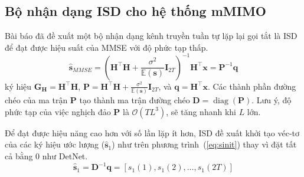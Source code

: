 \subsection{Bộ nhận dạng ISD cho hệ thống mMIMO}

Bài báo đã đề xuất một bộ nhận dạng kênh truyền tuần tự lặp lại gọi tắt là ISD để đạt được hiệu suất của MMSE với độ phức tạp thấp.
\begin{equation}
    \hat{\mathbf{s}}_{MMSE}=\left(\mathbf{H}^\top \mathbf{H}+\frac{\sigma^2}{\mathbb{E}(\mathbf{s})} \mathbf{I}_{2T}\right)^{-1} \mathbf{H}^\top \mathbf{x}=\mathbf{P}^{-1} \mathbf{q}
\end{equation}
ký hiệu $\mathbf{G}_\mathbf{H} = \mathbf{H}^\top \mathbf{H}$, $\mathbf{P} = \mathbf{H}^\top \mathbf{H}+\frac{\sigma^2}{\mathbb{E}(\mathbf{s})} \mathbf{I}_{2T}$, và $\mathbf{q} = \mathbf{H}^\top \mathbf{x}$. 
Các thành phần đường chéo của ma trận $\mathbf{P}$ tạo thành ma trận đường chéo $\mathbf{D} = \operatorname{diag}(\mathbf{P})$.
Lưu ý, độ phức tạp của việc nghịch đảo $\mathbf{P}$ là $\mathcal{O}(TL^3)$, sẽ tăng nhanh khi $L$ lớn. 

Để đạt được hiệu năng cao hơn với số lần lặp ít hơn, ISD đề xuất khởi tạo véc-tơ của các ký hiệu ước lượng ($\hat{\mathbf{s}}_1$) như trên phương trình~(\ref{eq:sinit}) thay vì đặt tất cả bằng $0$ như DetNet.
\begin{equation}
\label{eq:sinit}
    \hat{\mathbf{s}}_1=\mathbf{D}^{-1} \mathbf{q}=\left[s_1(1), s_1(2), \ldots, s_1(2T)\right]
\end{equation}

